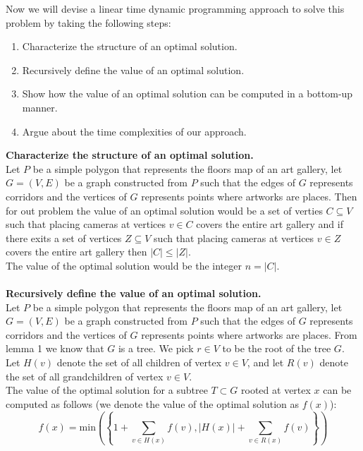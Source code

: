 \documentclass[addpoints,a4paper]{exam}
\begin{document}
\begin{questions}
\begin{solution}
\begin{parts}
			Now we will devise a linear time dynamic programming approach to solve this problem by taking the following steps:
			\begin{enumerate}
				\item Characterize the structure of an optimal solution.
				\item Recursively define the value of an optimal solution.
				\item Show how the value of an optimal solution can be computed in a bottom-up manner.
				\item Argue about the time complexities of our approach.
			\end{enumerate}
			\textbf{Characterize the structure of an optimal solution.}
			\\Let $P$ be a simple polygon that represents the floors map of an art gallery, let $G = (V,E)$ be a graph constructed from $P$ such that the edges of $G$ represents corridors and the vertices of $G$ represents points where artworks are places.
			Then for out problem the value of an optimal solution would be a set of verties $C \subseteq V$ such that placing cameras at vertices $v \in C$ covers the entire art gallery and if there exits a set of vertices $Z \subseteq V$ such that placing cameras 
			at vertices $v \in Z$ covers the entire art gallery then $|C| \leq |Z|$.
			\\The value of the optimal solution would be the integer $n = |C|$.
			\\\\\textbf{Recursively define the value of an optimal solution.}
			\\Let $P$ be a simple polygon that represents the floors map of an art gallery, let $G = (V,E)$ be a graph constructed from $P$ such that the edges of $G$ represents corridors and the vertices of $G$ represents points where artworks are places.
			From lemma 1 we know that $G$ is a tree. We pick $r \in V$ to be the root of the tree $G$.
			\\Let $H(v)$ denote the set of all children of vertex $v \in V$, and let $R(v)$ denote the set of all grandchildren of vertex $v \in V$.
			\\The value of the optimal solution for a subtree $T \subset G$ rooted at vertex $x$ can be computed as follows (we denote the value of the optimal solution as $f(x)$):
			$$f(x) = \text{min}\left(\left\{1 + \sum_{v \in H(x)}f(v), |H(x)| + \sum_{v \in R(x)}f(v)\right\}\right)$$

\end{parts}
\end{solution}
\end{questions}
\end{document}
